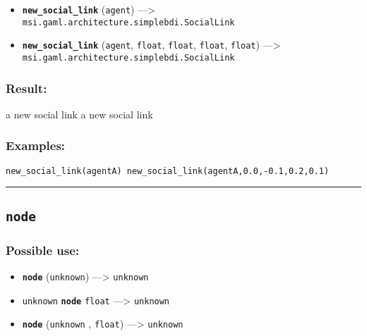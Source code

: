 \documentclass[]{book}
\providecommand{\tightlist}{%
  \setlength{\itemsep}{0pt}\setlength{\parskip}{0pt}}
\theoremstyle{definition}
\theoremstyle{definition}
\theoremstyle{definition}
\theoremstyle{remark}
\begin{document}
\begin{itemize}
\tightlist
\item
  \textbf{\texttt{new\_social\_link}} (\texttt{agent}) ---\textgreater{}
  \texttt{msi.gaml.architecture.simplebdi.SocialLink}
\item
  \textbf{\texttt{new\_social\_link}} (\texttt{agent}, \texttt{float},
  \texttt{float}, \texttt{float}, \texttt{float}) ---\textgreater{}
  \texttt{msi.gaml.architecture.simplebdi.SocialLink}
\end{itemize}

\subsubsection{Result:}\label{result-360}

a new social link a new social link

\subsubsection{Examples:}\label{examples-259}

\begin{verbatim}
new_social_link(agentA) new_social_link(agentA,0.0,-0.1,0.2,0.1) 
\end{verbatim}

\begin{center}\rule{0.5\linewidth}{\linethickness}\end{center}

\subsection{\texorpdfstring{\texttt{node}}{node}}\label{node}

\subsubsection{Possible use:}\label{possible-use-373}

\begin{itemize}
\tightlist
\item
  \textbf{\texttt{node}} (\texttt{unknown}) ---\textgreater{}
  \texttt{unknown}
\item
  \texttt{unknown} \textbf{\texttt{node}} \texttt{float}
  ---\textgreater{} \texttt{unknown}
\item
  \textbf{\texttt{node}} (\texttt{unknown} , \texttt{float})
  ---\textgreater{} \texttt{unknown}
\end{itemize}
\end{document}
